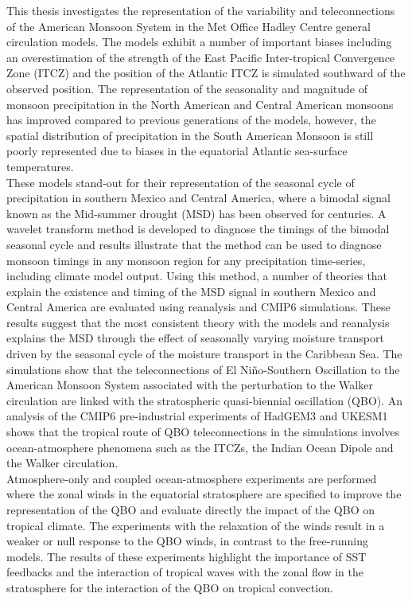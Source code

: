 This thesis investigates the representation of the variability and teleconnections of the American Monsoon System in the Met Office Hadley Centre general circulation models. 
The models exhibit a number of important biases including an overestimation of the strength of the East Pacific Inter-tropical Convergence Zone (ITCZ) and the position of the Atlantic ITCZ is simulated southward of the observed position. 
The representation of the seasonality and magnitude of monsoon precipitation in the North American and Central American monsoons has improved compared to previous generations of the models, however, the spatial distribution of precipitation in the South American Monsoon is still poorly represented due to biases in the equatorial Atlantic sea-surface temperatures.
\\
These models stand-out for their representation of the seasonal cycle of precipitation in southern Mexico and Central America, where a bimodal signal known as the Mid-summer drought (MSD) has been observed for centuries. 
A wavelet transform method is developed to diagnose the timings of the bimodal seasonal cycle and results illustrate that the method can be used to diagnose monsoon timings in any monsoon region for any precipitation time-series, including climate model output.
Using this method, a number of theories that explain the existence and timing of the MSD signal in southern Mexico and Central America are evaluated using reanalysis and CMIP6 simulations.
These results suggest that the most consistent theory with the models and reanalysis explains the MSD through the effect of seasonally varying moisture transport driven by the seasonal cycle of the moisture transport in the Caribbean Sea. 
The simulations show that the teleconnections of El Niño-Southern Oscillation to the American Monsoon System associated with the perturbation to the Walker circulation are linked with the stratospheric quasi-biennial oscillation (QBO). 
An analysis of the CMIP6 pre-industrial experiments of HadGEM3 and UKESM1 shows that the tropical route of QBO teleconnections in the simulations involves ocean-atmosphere phenomena such as the ITCZs, the Indian Ocean Dipole and the Walker circulation. 
\\
Atmosphere-only and coupled ocean-atmosphere experiments are performed where the zonal winds in the equatorial stratosphere are specified to improve the representation of the QBO and evaluate directly the impact of the QBO on tropical climate. 
The experiments with the relaxation of the winds result in a weaker or null response to the QBO winds, in contrast to the free-running models. 
The results of these experiments highlight the importance of SST feedbacks and the interaction of tropical waves with the zonal flow in the stratosphere for the interaction of the QBO on tropical convection.